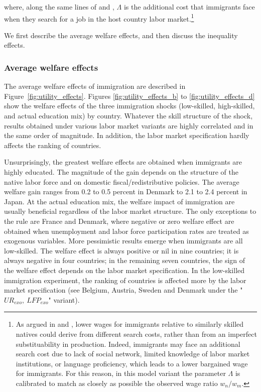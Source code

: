 \documentclass[a4paper,12pt]{article}
\begin{document}
\begin{itemize}
where, along the same lines of \citet{Chassamboulli2014} and \citet{Battisti2018}, $\Lambda$ is the additional cost that immigrants face when they search for a job in the host country labor market.\footnote{As argued in \citet{Chassamboulli2014} and \citet{Battisti2018}, lower wages for immigrants relative to similarly skilled natives could derive from different search costs, rather than from an imperfect substituability in production. Indeed, immigrants may face an additional search cost due to lack of social network, limited knowledge of labor market institutions, or language proficiency, which leads to a lower bargained wage for immigrants. For this reason, in this model variant the parameter $\Lambda$ is calibrated to match as closely as possible the observed wage ratio $w_n/w_m$. }
\end{itemize}
We first describe the average welfare effects, and then discuss the inequality effects.

\subsubsection{Average welfare effects}

The average welfare effects of immigration are described in Figure~\ref{fig:utility_effects}. Figures \ref{fig:utility_effects_b} to \ref{fig:utility_effects_d} show the welfare effects of the three immigration shocks (low-skilled, high-skilled, and actual education mix) by country. Whatever the skill structure of the shock, results obtained under various labor market variants are highly correlated and in the same order of magnitude. In addition, the labor market specification hardly affects the ranking of countries. 

Unsurprisingly, the greatest welfare effects are obtained when immigrants are highly educated. The magnitude of the gain depends on the structure of the native labor force and on domestic fiscal/redistributive policies. The average welfare gain ranges from 0.2 to 0.5 percent in Denmark to 2.1 to 2.4 percent in Japan. At the actual education mix, the welfare impact of immigration are usually beneficial regardless of the labor market structure. The only exceptions to the rule are France and Denmark, where negative or zero welfare effect are obtained when unemployment and labor force participation rates are treated as exogenous variables. More pessimistic results emerge when immigrants are all low-skilled. The welfare effect is always positive or nil in nine countries; it is always negative in four countries; in the remaining seven countries, the sign of the welfare effect depends on the labor market specification. In the low-skilled immigration experiment, the ranking of countries is affected more by the labor market specification (see Belgium, Austria, Sweden and Denmark under the "$UR_{exo},~LFP_{exo}$" variant).
\end{document}
